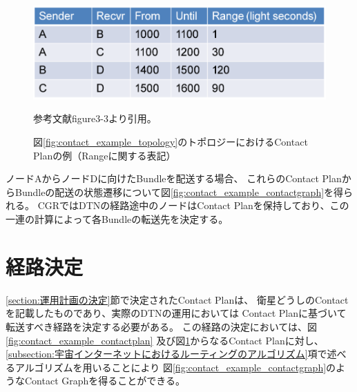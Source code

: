 \begin{figure}[tbh]
    \centering
    \includegraphics[width=0.5\textheight]{img/contact_example_contactrange.pdf}
    \caption{図\ref{fig:contact_example_topology}のトポロジーにおけるContact Planの例（Rangeに関する表記）}
    \label{fig:contact_example_contactrange}
    \begin{minipage}{\textwidth}
        \centering
        \vspace{3mm}
        参考文献\cite{schedule_aware_bundle_routing}figure3-3より引用。
    \end{minipage}
\end{figure}
ノードAからノードDに向けたBundleを配送する場合、
これらのContact PlanからBundleの配送の状態遷移について図\ref{fig:contact_example_contactgraph}を得られる。
CGRではDTNの経路途中のノードはContact Planを保持しており、この一連の計算によって各Bundleの転送先を決定する。

\section{経路決定}
\label{subsection:経路決定}

\ref{section:運用計画の決定}節で決定されたContact Planは、
衛星どうしのContactを記載したものであり、実際のDTNの運用においては
Contact Planに基づいて転送すべき経路を決定する必要がある。
この経路の決定においては、図\ref{fig:contact_example_contactplan}
及び図\ref{fig:contact_example_contactrange}からなるContact Planに対し、
\ref{subsection:宇宙インターネットにおけるルーティングのアルゴリズム}項で述べるアルゴリズムを用いることにより
図\ref{fig:contact_example_contactgraph}のようなContact Graphを得ることができる。

